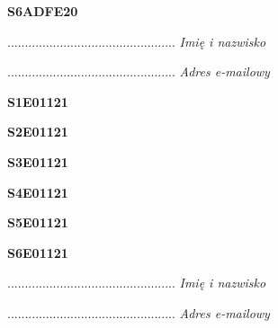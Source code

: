 \begin{turn}{90}\huge \textbf{S6ADFE20}\end{turn}

\begin{turn}{90}\begin{minipage}{\linewidth} \vspace{20mm} ................................................  \textit{Imię i nazwisko}\end{minipage}\end{turn}

\begin{turn}{90}\begin{minipage}{\linewidth} \vspace{20mm} ................................................  \textit{Adres e-mailowy}\end{minipage}\end{turn}

\begin{turn}{90}\huge \textbf{S1E01121}\end{turn}

\begin{turn}{90}\huge \textbf{S2E01121}\end{turn}

\begin{turn}{90}\huge \textbf{S3E01121}\end{turn}

\begin{turn}{90}\huge \textbf{S4E01121}\end{turn}

\begin{turn}{90}\huge \textbf{S5E01121}\end{turn}

\begin{turn}{90}\huge \textbf{S6E01121}\end{turn}

\begin{turn}{90}\begin{minipage}{\linewidth} \vspace{20mm} ................................................  \textit{Imię i nazwisko}\end{minipage}\end{turn}

\begin{turn}{90}\begin{minipage}{\linewidth} \vspace{20mm} ................................................  \textit{Adres e-mailowy}\end{minipage}\end{turn}

